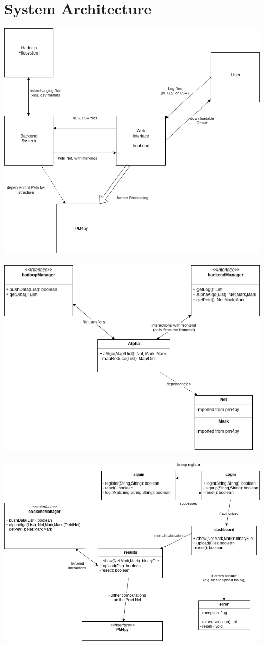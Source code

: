 \documentclass[runningheads]{llncs}
\begin{document}
\section{System Architecture}
\includegraphics[scale=.35]{HighLevelDesign.png} \\ \ \\
\includegraphics[scale=.35]{Backend.png} \\ \ \\
\includegraphics[scale=.35]{WebApp.png}
\end{document}
